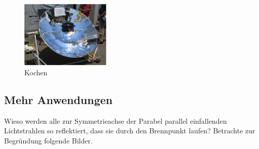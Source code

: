 \documentclass[%
<<<<<<< Updated upstream
11pt,%
twoside,%
titlepage,%
german,%
=======
11pt,%
twoside,%
titlepage,%
swissgerman,%
>>>>>>> Stashed changes
headsepline%
]{scrartcl}
\theoremstyle{definition}
\theoremstyle{plain}
\begin{document}
\begin{figure}
\centering
\includegraphics[width=0.382\textwidth]{pictures/herd}
\caption{Kochen}
\end{figure}

\subsection{Mehr Anwendungen}

Wieso werden alle zur Symmetrieachse der Parabel parallel einfallenden Lichtstrahlen so reflektiert, dass sie durch den Brennpunkt laufen? Betrachte zur Begr\"undung folgende Bilder.
\end{document}
